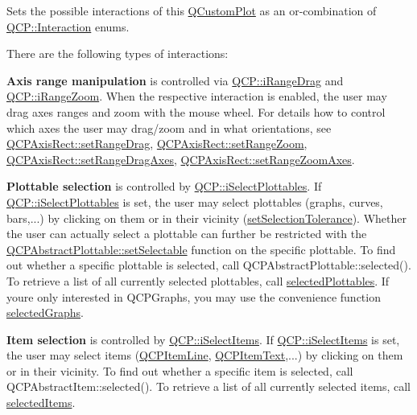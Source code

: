 Sets the possible interactions of this \hyperlink{classQCustomPlot}{Q\+Custom\+Plot} as an or-\/combination of \hyperlink{namespaceQCP_a2ad6bb6281c7c2d593d4277b44c2b037}{Q\+C\+P\+::\+Interaction} enums. 

There are the following types of interactions\+:

{\bfseries Axis range manipulation} is controlled via \hyperlink{namespaceQCP_a2ad6bb6281c7c2d593d4277b44c2b037a2c4432b9aceafb94000be8d1b589ef18}{Q\+C\+P\+::i\+Range\+Drag} and \hyperlink{namespaceQCP_a2ad6bb6281c7c2d593d4277b44c2b037abee1e94353525a636aeaf0ba32b72e14}{Q\+C\+P\+::i\+Range\+Zoom}. When the respective interaction is enabled, the user may drag axes ranges and zoom with the mouse wheel. For details how to control which axes the user may drag/zoom and in what orientations, see \hyperlink{classQCPAxisRect_ae6aef2f7211ba6097c925dcd26008418}{Q\+C\+P\+Axis\+Rect\+::set\+Range\+Drag}, \hyperlink{classQCPAxisRect_a7960a9d222f1c31d558b064b60f86a31}{Q\+C\+P\+Axis\+Rect\+::set\+Range\+Zoom}, \hyperlink{classQCPAxisRect_a648cce336bd99daac4a5ca3e5743775d}{Q\+C\+P\+Axis\+Rect\+::set\+Range\+Drag\+Axes}, \hyperlink{classQCPAxisRect_a9442cca2aa358405f39a64d51eca13d2}{Q\+C\+P\+Axis\+Rect\+::set\+Range\+Zoom\+Axes}.

{\bfseries Plottable selection} is controlled by \hyperlink{namespaceQCP_a2ad6bb6281c7c2d593d4277b44c2b037a67148c8227b4155eca49135fc274c7ec}{Q\+C\+P\+::i\+Select\+Plottables}. If \hyperlink{namespaceQCP_a2ad6bb6281c7c2d593d4277b44c2b037a67148c8227b4155eca49135fc274c7ec}{Q\+C\+P\+::i\+Select\+Plottables} is set, the user may select plottables (graphs, curves, bars,...) by clicking on them or in their vicinity (\hyperlink{classQCustomPlot_a4dc31241d7b09680950e19e5f971ed93}{set\+Selection\+Tolerance}). Whether the user can actually select a plottable can further be restricted with the \hyperlink{classQCPAbstractPlottable_a22c69299eb5569e0f6bf084877a37dc4}{Q\+C\+P\+Abstract\+Plottable\+::set\+Selectable} function on the specific plottable. To find out whether a specific plottable is selected, call Q\+C\+P\+Abstract\+Plottable\+::selected(). To retrieve a list of all currently selected plottables, call \hyperlink{classQCustomPlot_a6721b8c689bb7f2f400987e580508fe8}{selected\+Plottables}. If you\textquotesingle{}re only interested in Q\+C\+P\+Graphs, you may use the convenience function \hyperlink{classQCustomPlot_ad2a0493bdd01e7aa99a4209ae3a5b67b}{selected\+Graphs}.

{\bfseries Item selection} is controlled by \hyperlink{namespaceQCP_a2ad6bb6281c7c2d593d4277b44c2b037aea2f7c105d674e76d9b187b02ef29260}{Q\+C\+P\+::i\+Select\+Items}. If \hyperlink{namespaceQCP_a2ad6bb6281c7c2d593d4277b44c2b037aea2f7c105d674e76d9b187b02ef29260}{Q\+C\+P\+::i\+Select\+Items} is set, the user may select items (\hyperlink{classQCPItemLine}{Q\+C\+P\+Item\+Line}, \hyperlink{classQCPItemText}{Q\+C\+P\+Item\+Text},...) by clicking on them or in their vicinity. To find out whether a specific item is selected, call Q\+C\+P\+Abstract\+Item\+::selected(). To retrieve a list of all currently selected items, call \hyperlink{classQCustomPlot_a1a48b13547e2d9ac5cd6927516f47a2e}{selected\+Items}.

